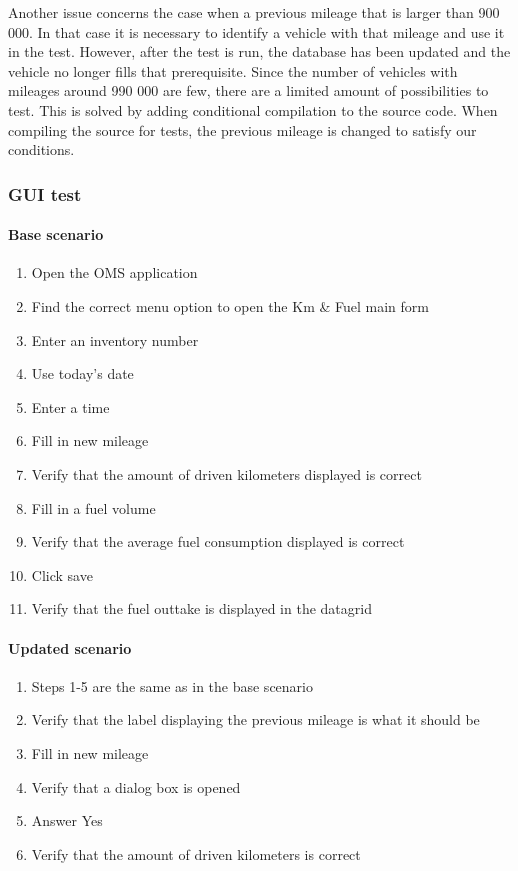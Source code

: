 \documentclass{article}
\begin{document}
			Another issue concerns the case when a previous mileage that is larger than 900 000. In that case it is necessary to identify a vehicle with that mileage and use it in the test.
			However, after the test is run, the database has been updated and the vehicle no longer fills that prerequisite. Since the number of vehicles with mileages around 990 000 are few, there are a limited amount of possibilities to test.
			This is solved by adding conditional compilation to the source code. When compiling the source for tests, the previous mileage is changed to satisfy our conditions.

			\subsubsection{GUI test}

			\paragraph{Base scenario}

			\begin{enumerate}
				\item Open the OMS application
				\item Find the correct menu option to open the Km \& Fuel main form
				\item Enter an inventory number
				\item Use today's date
				\item Enter a time
				\item Fill in new mileage
				\item Verify that the amount of driven kilometers displayed is correct
				\item Fill in a fuel volume
				\item Verify that the average fuel consumption displayed is correct
				\item Click save
				\item Verify that the fuel outtake is displayed in the datagrid
			\end{enumerate}
				
			\paragraph{Updated scenario}

			\begin{enumerate}
				\item Steps 1-5 are the same as in the base scenario
				\setcounter{enumi}{5}
				\item Verify that the label displaying the previous mileage is what it should be
				\item Fill in new mileage
				\item Verify that a dialog box is opened
				\item Answer Yes
				\item Verify that the amount of driven kilometers is correct
			\end{enumerate}
\end{document}

